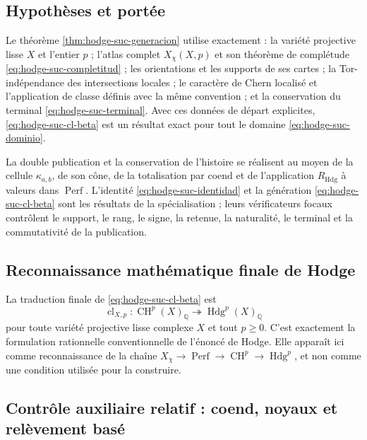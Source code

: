 \subsection*{Hypothèses et portée}

Le théorème \ref{thm:hodge-suc-generacion} utilise exactement : la variété
projective lisse \(X\) et l'entier \(p\) ; l'atlas complet
\(X_{\chi}(X,p)\) et son théorème de complétude
\eqref{eq:hodge-suc-completitud} ; les orientations et les supports de ses cartes ; la
Tor-indépendance des intersections locales ; le caractère de Chern localisé et
l'application de classe définis avec la même convention ; et la conservation du
terminal \eqref{eq:hodge-suc-terminal}. Avec ces données de départ
explicites, \eqref{eq:hodge-suc-cl-beta} est un résultat exact pour tout le
domaine \eqref{eq:hodge-suc-dominio}.

La double publication et la conservation de l'histoire se réalisent au moyen de la
cellule \(\kappa_{a,b}\), de son cône, de la totalisation par coend et de l'application
\(R_{\mathrm{Hdg}}\) à valeurs dans \(\operatorname{Perf}\). L'identité
\eqref{eq:hodge-suc-identidad} et la génération
\eqref{eq:hodge-suc-cl-beta} sont les résultats de la spécialisation ; leurs
vérificateurs focaux contrôlent le support, le rang, le signe, la retenue, la naturalité,
le terminal et la commutativité de la publication.

\subsection{Reconnaissance mathématique finale de Hodge}

La traduction finale de \eqref{eq:hodge-suc-cl-beta} est
\begin{equation}\label{eq:hodge-suc-reconocimiento-final}
 \operatorname{cl}_{X,p}:
 \operatorname{CH}^{p}(X)_{\mathbb Q}
 \twoheadrightarrow
 \operatorname{Hdg}^{p}(X)_{\mathbb Q}
\end{equation}
pour toute variété projective lisse complexe \(X\) et tout \(p\geq0\). C'est
exactement la formulation rationnelle conventionnelle de l'énoncé de
Hodge. Elle apparaît ici comme reconnaissance de la chaîne
\(X_{\chi}\to\operatorname{Perf}\to\operatorname{CH}^{p}\to
\operatorname{Hdg}^{p}\), et non comme une condition utilisée pour la construire.

\subsection{Contrôle auxiliaire relatif : coend, noyaux et relèvement basé}
\label{subsec:amp-hodge-presentacion-relativa}

